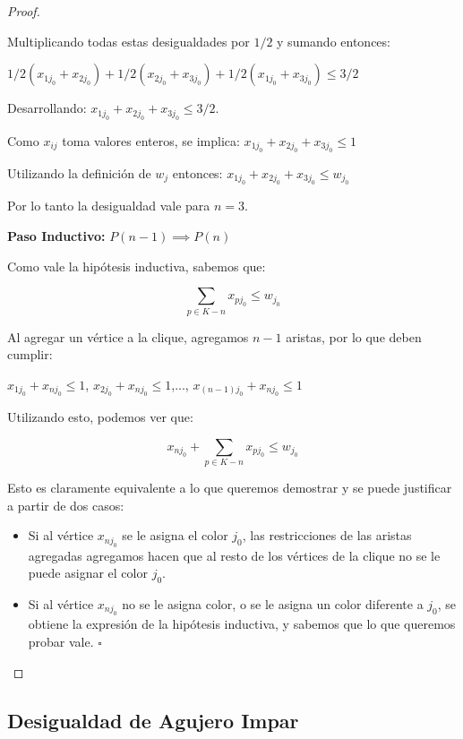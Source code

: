 \begin{proof}
\begin{enumerate}
Multiplicando todas estas desigualdades por $1/2$ y sumando entonces:

$1/2 (x_{1j_0} + x_{2j_0})  + 1/2 (x_{2j_0} + x_{3j_0}) + 1/2 (x_{1j_0} + x_{3j_0}) \leq 3/2$

Desarrollando: $x_{1j_0} + x_{2j_0} +  x_{3j_0} \leq 3/2$.

Como $x_{ij}$ toma valores enteros, se implica:
$x_{1j_0} + x_{2j_0} +  x_{3j_0} \leq 1$

Utilizando la definición de $w_j$ entonces: $x_{1j_0} + x_{2j_0} +  x_{3j_0} \leq w_{j_0}$

Por lo tanto la desigualdad vale para $n=3$.

\end{enumerate}

\hfill

\textbf{Paso Inductivo:} $P(n-1) \implies P(n)$

Como vale la hipótesis inductiva, sabemos que:

\begin{equation*}
\sum_{p \in K-n} x_{pj_0} \leq w_{j_0}
\end{equation*}

Al agregar un vértice a la clique, agregamos $n-1$ aristas, por lo que deben cumplir:

$x_{1j_0} + x_{nj_0} \leq 1$, $x_{2j_0} + x_{nj_0} \leq 1$,...,
$x_{(n-1)j_0} + x_{nj_0} \leq 1$

Utilizando esto, podemos ver que:

\begin{equation*}
x_{nj_0} + \sum_{p \in K-n} x_{pj_0} \leq w_{j_0}
\end{equation*}

Esto es claramente equivalente a lo que queremos demostrar y se puede justificar a partir de dos casos:

\begin{itemize}
\item Si al vértice $x_{nj_0}$ se le asigna el color $j_0$, las restricciones de las aristas agregadas agregamos hacen que al resto de los vértices de la clique no se le puede asignar el color $j_0$.
\item Si al vértice $x_{nj_0}$ no se le asigna color, o se le asigna un color diferente a $j_0$, se obtiene la expresión de la hipótesis inductiva, y sabemos que lo que queremos probar vale. \hfill $\square$
\end{itemize}
\end{proof}

\subsection{Desigualdad de Agujero Impar}

